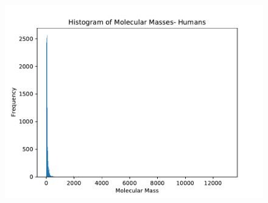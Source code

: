 \documentclass[a4paper]{article}
\begin{document}
\begin{figure}
    \includegraphics{human_mass.pdf}
\centering 
\end{figure}
\pagebreak 
\end{document}
